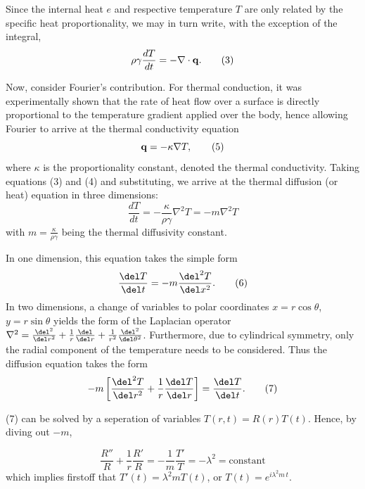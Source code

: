 \documentclass[11pt]{article}
\begin{document}
\begin{multicols}{2}
    Since the internal heat $e$ and respective temperature $T$ are only related by the specific heat proportionality, we may in turn write, with the exception of the integral, 
    \[
        \rho \gamma \frac{dT}{dt} = -\nabla \cdot {\bf{q}}. \tag{3}  
    \]

    Now, consider Fourier's contribution. For thermal conduction, it was experimentally shown that the rate of heat flow over a surface is directly proportional to the temperature gradient applied over the body, hence allowing Fourier to arrive at the thermal conductivity equation 
    \[
        {\bf{q}} = -\kappa \nabla T, \tag{5}
    \]
    \nd where $\kappa$ is the proportionality constant, denoted the thermal conductivity. Taking equations (3) and (4) and substituting, we arrive at the thermal diffusion (or heat) equation in three dimensions:
    \[
        \frac{dT}{dt} = -\frac{\kappa}{\rho \gamma} \nabla^2 T = -m\nabla^2 T \tag{5}    
    \]
    \nd with $m = \frac{\kappa}{\rho\gamma}$ being the thermal diffusivity constant.

    In one dimension, this equation takes the simple form 
    \[
        \frac{\del T}{\del t} = -m\frac{\del^2 T}{\del x^2}. \tag{6}
    \]
    \nd In two dimensions, a change of variables to polar coordinates $x=r\cos\theta$, \\ $y=r\sin\theta$ yields the form of the Laplacian operator $\nabla^2 = \frac{\del^2 }{\del r^2} + \frac{1}{r}\frac{\del}{\del r} + \frac{1}{r^2}\frac{\del^2}{\del\theta^2}$. Furthermore, due to cylindrical symmetry,  only the radial component of the temperature needs to be considered. Thus the diffusion equation takes the form
    \[
        -m\left[\frac{\del^2 T}{\del r^2} + \frac{1}{r}\frac{\del T}{\del r}\right] = \frac{\del T}{\del t}. \tag{7} 
    \] 

    (7) can be solved by a seperation of variables $T(r,t) = R(r)T(t)$. Hence, by diving out $-m$, 

    \[
        \frac{R''}{R} + \frac{1}{r}\frac{R'}{R} = -\frac{1}{m}\frac{T'}{T} = -\lambda^2 = \text{constant} \tag{8}
    \]
    \nd which implies firstoff that $T'(t) = \lambda^2mT(t)$, or $T(t) = e^{i\lambda^2m\,t}$.
    

\end{multicols}
\end{document}
